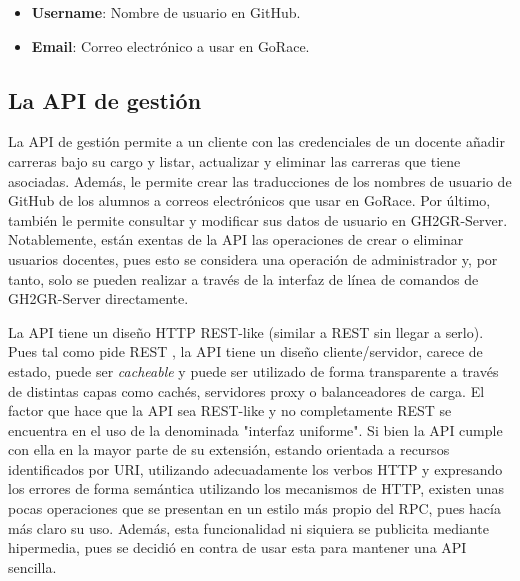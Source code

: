 \begin{itemize}
    \item \textbf{Username}: Nombre de usuario en GitHub.
    \item \textbf{Email}: Correo electrónico a usar en GoRace.
\end{itemize}

\subsection{La API de gestión} \label{api-gesion}
La \acrshort{API} de gestión permite a un cliente con las credenciales de un docente añadir carreras bajo su cargo y listar, actualizar y eliminar las carreras que tiene asociadas. Además, le permite crear las traducciones de los nombres de usuario de GitHub de los alumnos a correos electrónicos que usar en GoRace. Por último, también le permite consultar y modificar sus datos de usuario en GH2GR-Server. Notablemente, están exentas de la \acrshort{API} las operaciones de crear o eliminar usuarios docentes, pues esto se considera una operación de administrador y, por tanto, solo se pueden realizar a través de la interfaz de línea de comandos de GH2GR-Server directamente.

La \acrshort{API} tiene un diseño \acrshort{HTTP} \acrshort{REST}-like (similar a \acrshort{REST} sin llegar a serlo). Pues tal como pide \acrshort{REST} \cite{REST}, la \acrshort{API} tiene un diseño cliente/servidor, carece de estado, puede ser \textit{cacheable} y puede ser utilizado de forma transparente a través de distintas capas como cachés, servidores proxy o balanceadores de carga. El factor que hace que la \acrshort{API} sea \acrshort{REST}-like y no completamente \acrshort{REST} se encuentra en el uso de la denominada "interfaz uniforme". Si bien la \acrshort{API} cumple con ella en la mayor parte de su extensión, estando orientada a recursos identificados por \acrshort{URI}, utilizando adecuadamente los verbos \acrshort{HTTP} y expresando los errores de forma semántica utilizando los mecanismos de \acrshort{HTTP}, existen unas pocas operaciones que se presentan en un estilo más propio del \acrshort{RPC}, pues hacía más claro su uso. Además, esta funcionalidad ni siquiera se publicita mediante hipermedia, pues se decidió en contra de usar esta para mantener una \acrshort{API} sencilla.

